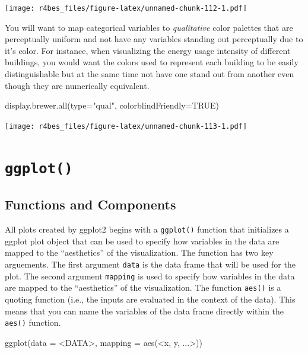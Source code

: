 \documentclass[
]{book}
\newenvironment{Shaded}{\begin{snugshade}}{\end{snugshade}}
\newcommand{\AttributeTok}[1]{\textcolor[rgb]{0.77,0.63,0.00}{#1}}
\newcommand{\ConstantTok}[1]{\textcolor[rgb]{0.00,0.00,0.00}{#1}}
\newcommand{\FunctionTok}[1]{\textcolor[rgb]{0.00,0.00,0.00}{#1}}
\newcommand{\NormalTok}[1]{#1}
\newcommand{\SpecialCharTok}[1]{\textcolor[rgb]{0.00,0.00,0.00}{#1}}
\newcommand{\StringTok}[1]{\textcolor[rgb]{0.31,0.60,0.02}{#1}}
\begin{document}
\texttt{[image: r4bes\_files/figure-latex/unnamed-chunk-112-1.pdf]}

You will want to map categorical variables to \emph{qualitative} color palettes that are perceptually uniform and not have any variables standing out perceptually due to it's color. For instance, when visualizing the energy usage intensity of different buildings, you would want the colors used to represent each building to be easily distinguishable but at the same time not have one stand out from another even though they are numerically equivalent.

\begin{Shaded}
\begin{Highlighting}[]
\FunctionTok{display.brewer.all}\NormalTok{(}\AttributeTok{type=}\StringTok{"qual"}\NormalTok{, }\AttributeTok{colorblindFriendly=}\ConstantTok{TRUE}\NormalTok{) }
\end{Highlighting}
\end{Shaded}

\texttt{[image: r4bes\_files/figure-latex/unnamed-chunk-113-1.pdf]}

\hypertarget{ggplot}{%
\section{\texorpdfstring{\texttt{ggplot()}}{ggplot()}}\label{ggplot}}

\hypertarget{functions-and-components}{%
\subsection{Functions and Components}\label{functions-and-components}}

All plots created by ggplot2 begins with a \texttt{ggplot()} function that initializes a ggplot plot object that can be used to specify how variables in the data are mapped to the ``aesthetics'' of the visualization. The function has two key arguements. The first argument \texttt{data} is the data frame that will be used for the plot. The second argument \texttt{mapping} is used to specify how variables in the data are mapped to the ``aesthetics'' of the visualization. The function \texttt{aes()} is a quoting function (i.e., the inputs are evaluated in the context of the data). This means that you can name the variables of the data frame directly within the \texttt{aes()} function.

\begin{Shaded}
\begin{Highlighting}[]
\FunctionTok{ggplot}\NormalTok{(}\AttributeTok{data =} \SpecialCharTok{\textless{}}\NormalTok{DATA}\SpecialCharTok{\textgreater{}}\NormalTok{, }\AttributeTok{mapping =} \FunctionTok{aes}\NormalTok{(}\SpecialCharTok{\textless{}}\NormalTok{x, y, ...}\SpecialCharTok{\textgreater{}}\NormalTok{))}
\end{Highlighting}
\end{Shaded}
\end{document}
